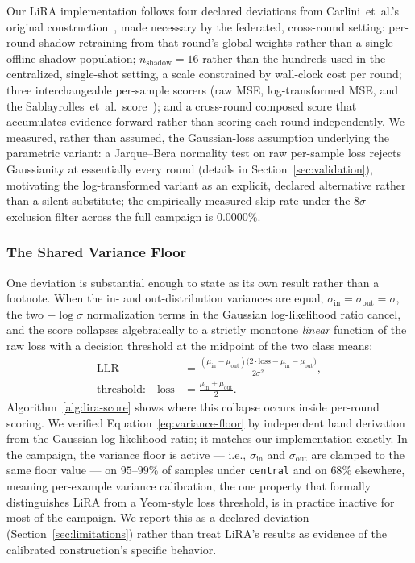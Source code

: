 Our LiRA implementation follows four declared deviations from
Carlini~et~al.'s original construction~\cite{carlini2022membership},
made necessary by the federated, cross-round setting: per-round shadow
retraining from that round's global weights rather than a single
offline shadow population; $n_{\text{shadow}} = 16$ rather than the
hundreds used in the centralized, single-shot setting, a scale
constrained by wall-clock cost per round; three interchangeable
per-sample scorers (raw MSE, log-transformed MSE, and the
Sablayrolles~et~al.\ score~\cite{sablayrolles2019whitebox}); and a
cross-round composed score that accumulates evidence forward rather
than scoring each round independently. We measured, rather than
assumed, the Gaussian-loss assumption underlying the parametric variant:
a Jarque--Bera normality test on raw per-sample loss rejects
Gaussianity at essentially every round (details in
Section~\ref{sec:validation}), motivating the log-transformed variant
as an explicit, declared alternative rather than a silent substitute;
the empirically measured skip rate under the $8\sigma$ exclusion filter
across the full campaign is $0.0000\%$.

\subsubsection{The Shared Variance Floor}
\label{sec:framework-variance-floor}

One deviation is substantial enough to state as its own result rather
than a footnote. When the in- and out-distribution variances are
equal, $\sigma_{\text{in}} = \sigma_{\text{out}} = \sigma$, the two
$-\log\sigma$ normalization terms in the Gaussian log-likelihood ratio
cancel, and the score collapses algebraically to a strictly monotone
\emph{linear} function of the raw loss with a decision threshold at
the midpoint of the two class means:
\begin{equation}
\begin{aligned}
\text{LLR}
&=
\frac{(\mu_{\text{in}}-\mu_{\text{out}})
\bigl(2\cdot\text{loss}-\mu_{\text{in}}-\mu_{\text{out}}\bigr)}
{2\sigma^2},
\\
\text{threshold:}\quad
\text{loss}
&=
\frac{\mu_{\text{in}}+\mu_{\text{out}}}{2}.
\end{aligned}
\label{eq:variance-floor}
\end{equation}
Algorithm~\ref{alg:lira-score} shows where this collapse occurs inside
per-round scoring. We verified Equation~\ref{eq:variance-floor} by
independent hand derivation from the Gaussian log-likelihood ratio; it
matches our implementation exactly. In the campaign, the variance floor
is active --- i.e., $\sigma_{\text{in}}$ and $\sigma_{\text{out}}$ are
clamped to the same floor value --- on $95$--$99\%$ of samples under
\texttt{central} and on $68\%$ elsewhere, meaning per-example variance
calibration, the one property that formally distinguishes LiRA from a
Yeom-style loss threshold, is in practice inactive for most of the
campaign. We report this as a declared deviation
(Section~\ref{sec:limitations}) rather than treat LiRA's results as
evidence of the calibrated construction's specific behavior.

